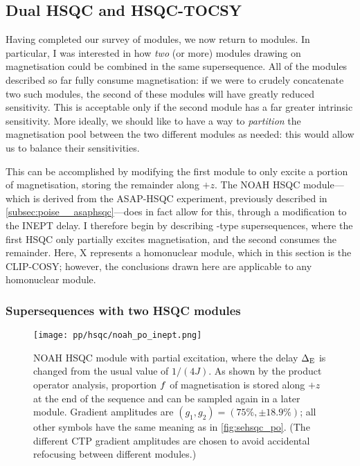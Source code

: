 \subsection{Dual HSQC and HSQC-TOCSY}
\label{subsec:noah__hsqctocsy}

Having completed our survey of \nitrogen{} modules, we now return to \carbon{} modules.
In particular, I was interested in how \textit{two} (or more) modules drawing on  magnetisation could be combined in the same supersequence.
All of the \carbon{} modules described so far fully consume  magnetisation: if we were to crudely concatenate two such modules, the second of these modules will have greatly reduced sensitivity.
This is acceptable only if the second module has a far greater intrinsic sensitivity.
More ideally, we should like to have a way to \textit{partition} the magnetisation pool between the two different modules as needed: this would allow us to balance their sensitivities.

This can be accomplished by modifying the first module to only excite a portion of  magnetisation, storing the remainder along $+z$.
The NOAH HSQC module---which is derived from the ASAP-HSQC experiment\autocite{SchulzeSunninghausen2014JACS,SchulzeSunninghausen2017JMR}, previously described in \cref{subsec:poise__asaphsqc}---does in fact allow for this, through a modification to the INEPT delay.
I therefore begin by describing -type supersequences, where the first HSQC only partially excites  magnetisation, and the second consumes the remainder.
Here, X represents a homonuclear module, which in this section is the CLIP-COSY; however, the conclusions drawn here are applicable to any homonuclear module.


\subsubsection{Supersequences with two HSQC modules}

\begin{figure}[!ht]
    \centering
    \texttt{[image: pp/hsqc/noah\_po\_inept.png]}%
    \caption[NOAH HSQC module with partial excitation product operator analysis]{
        NOAH HSQC module with partial excitation, where the delay $\Delta_{\text{E}}$ is changed from the usual value of $1 / (4J)$.
        As shown by the product operator analysis, proportion $f\/$ of  magnetisation is stored along $+z$ at the end of the sequence and can be sampled again in a later module.
        Gradient amplitudes are $(g_1, g_2) = (75\%, \pm 18.9\%)$; all other symbols have the same meaning as in \cref{fig:sehsqc_po}.
        (The different CTP gradient amplitudes are chosen to avoid accidental refocusing between different modules.)
    }
    \label{fig:noah_hsqc_deltae_po}
\end{figure}

